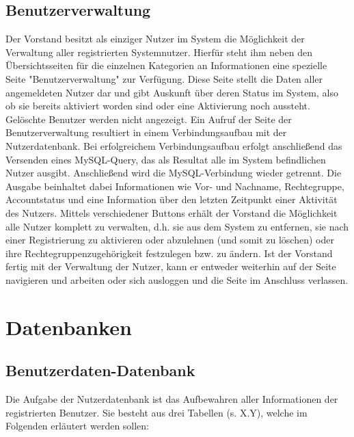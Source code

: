 \documentclass[fontsize = 12pt, paper = a4]{scrreprt}
\begin{document}
\subsection{Benutzerverwaltung}

Der Vorstand besitzt als einziger Nutzer im System die Möglichkeit der Verwaltung aller registrierten Systemnutzer. Hierfür steht ihm neben den Übersichtsseiten für die einzelnen Kategorien an Informationen eine spezielle Seite "Benutzerverwaltung" zur Verfügung. Diese Seite stellt die Daten aller angemeldeten Nutzer dar und gibt Auskunft über deren Status im System, also ob sie bereits aktiviert worden sind oder eine Aktivierung noch aussteht. Gelöschte Benutzer werden nicht angezeigt. Ein Aufruf der Seite der Benutzerverwaltung resultiert in einem Verbindungsaufbau mit der Nutzerdatenbank. Bei erfolgreichem Verbindungsaufbau erfolgt anschließend das Versenden eines MySQL-Query, das als Resultat alle im System befindlichen Nutzer ausgibt. Anschließend wird die MySQL-Verbindung wieder getrennt. Die Ausgabe beinhaltet dabei Informationen wie Vor- und Nachname, Rechtegruppe, Accountstatus und eine Information über den letzten Zeitpunkt einer Aktivität des Nutzers. Mittels verschiedener Buttons erhält der Vorstand die Möglichkeit alle Nutzer komplett zu verwalten, d.h. sie aus dem System zu entfernen, sie nach einer Registrierung zu aktivieren oder abzulehnen (und somit zu löschen) oder ihre Rechtegruppenzugehörigkeit festzulegen bzw. zu ändern. Ist der Vorstand fertig mit der Verwaltung der Nutzer, kann er entweder weiterhin auf der Seite navigieren  und arbeiten oder sich ausloggen und die Seite im Anschluss verlassen.


\section{Datenbanken}

\subsection{Benutzerdaten-Datenbank}

Die Aufgabe der Nutzerdatenbank ist das Aufbewahren aller Informationen der registrierten Benutzer. Sie besteht aus drei Tabellen (s. X.Y), welche im Folgenden erläutert werden sollen:
\end{document}
